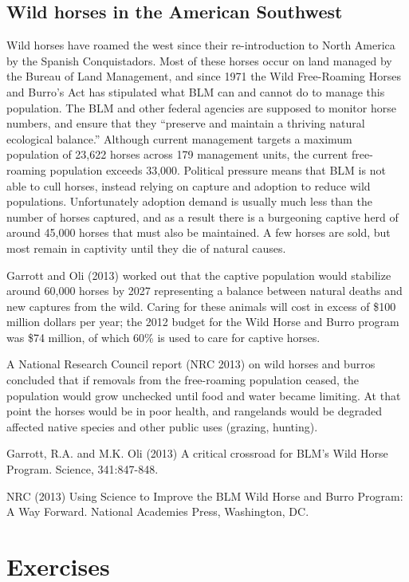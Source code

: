 \documentclass[]{book}
\let\BeginKnitrBlock\begin \let\EndKnitrBlock\end
\begin{document}
\BeginKnitrBlock{.rmdnote}
\subsection{Wild horses in the American Southwest}\label{wild-horses}

Wild horses have roamed the west since their re-introduction to North
America by the Spanish Conquistadors. Most of these horses occur on land
managed by the Bureau of Land Management, and since 1971 the Wild
Free-Roaming Horses and Burro's Act has stipulated what BLM can and
cannot do to manage this population. The BLM and other federal agencies
are supposed to monitor horse numbers, and ensure that they ``preserve
and maintain a thriving natural ecological balance.'' Although current
management targets a maximum population of 23,622 horses across 179
management units, the current free-roaming population exceeds 33,000.
Political pressure means that BLM is not able to cull horses, instead
relying on capture and adoption to reduce wild populations.
Unfortunately adoption demand is usually much less than the number of
horses captured, and as a result there is a burgeoning captive herd of
around 45,000 horses that must also be maintained. A few horses are
sold, but most remain in captivity until they die of natural causes.

Garrott and Oli (2013) worked out that the captive population would
stabilize around 60,000 horses by 2027 representing a balance between
natural deaths and new captures from the wild. Caring for these animals
will cost in excess of \$100 million dollars per year; the 2012 budget
for the Wild Horse and Burro program was \$74 million, of which 60\% is
used to care for captive horses.

A National Research Council report (NRC 2013) on wild horses and burros
concluded that if removals from the free-roaming population ceased, the
population would grow unchecked until food and water became limiting. At
that point the horses would be in poor health, and rangelands would be
degraded affected native species and other public uses (grazing,
hunting).

Garrott, R.A. and M.K. Oli (2013) A critical crossroad for BLM's Wild
Horse Program. Science, 341:847-848.

NRC (2013) Using Science to Improve the BLM Wild Horse and Burro
Program: A Way Forward. National Academies Press, Washington, DC.
\EndKnitrBlock{.rmdnote}

\section{Exercises}\label{exercises}
\end{document}

